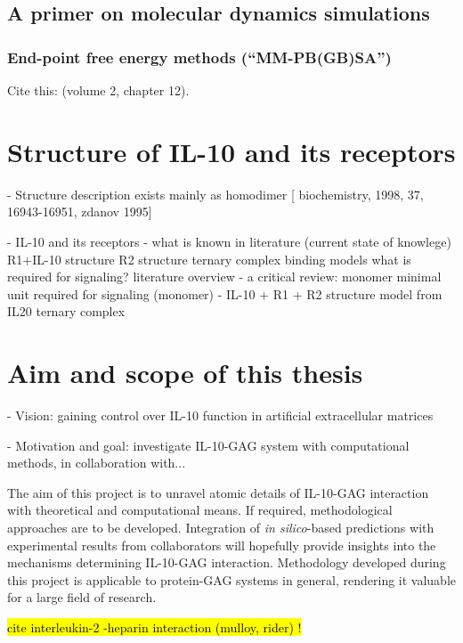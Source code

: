 \lipsum[1-5]

\subsection{A primer on molecular dynamics simulations}

\lipsum[1-5]

\subsubsection{End-point free energy methods (\enquote{MM-PB(GB)SA})}
\label{methods:mmpbsa_mmgbsa}


Cite this: \cite{schlick_innovationsdynamics_2012} (volume 2, chapter 12).

\lipsum[1-5]

\section{Structure of IL-10 and its receptors}

    - Structure description
        exists mainly as homodimer [
            biochemistry, 1998, 37, 16943-16951, zdanov 1995]


    - IL-10 and its receptors
        - what is known in literature (current state of knowlege)
            R1+IL-10 structure
            R2 structure
            ternary complex binding models
            what is required for signaling? literature overview
        - a critical review: monomer
            minimal unit required for signaling (monomer)
        - IL-10 + R1 + R2 structure model from IL20 ternary complex


\section{Aim and scope of this thesis}

- Vision: gaining control over IL-10 function in artificial extracellular matrices

- Motivation and goal: investigate IL-10-GAG system with computational
      methods, in collaboration with...

The aim of this project is to unravel atomic details of IL-10-GAG interaction
with theoretical and computational means. If required, methodological approaches
are to be developed. Integration of \textit{in silico}-based predictions with
experimental results from collaborators will hopefully provide insights into the
mechanisms determining IL-10-GAG interaction. Methodology developed during this
project is applicable to protein-GAG systems in general, rendering it valuable
for a large field of research.



\hl{cite interleukin-2 -heparin interaction (mulloy, rider) !}

\lipsum[1-5]





